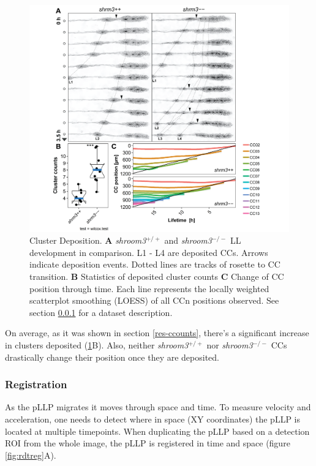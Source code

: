 \documentclass[11pt,singlespacinge,twoside]{reedthesis} %
\theoremstyle{definition}
\theoremstyle{definition}
\theoremstyle{definition}
\theoremstyle{remark}
\begin{document}
\begin{figure}

{\centering \includegraphics[width=0.95\linewidth]{figures/results/03_rosettes/tracking-01} 

}

\caption[Cluster Deposition]{Cluster Deposition. \textbf{A} \emph{shroom3}\(^{+/+}\) and \emph{shroom3}\(^{-/-}\) LL development in comparison. L1 - L4 are deposited CCs. Arrows indicate deposition events. Dotted lines are tracks of rosette to CC transition. \textbf{B} Statistics of deposited cluster counts \textbf{C} Change of CC position through time. Each line represents the locally weighted scatterplot smoothing (LOESS) of all CCn positions observed. See section \ref{res-rosreg} for a dataset description.}\label{fig:rdtdepo}
\end{figure}
On average, as it was shown in section \ref{res-ccounts}, there's a significant increase in clusters deposited (\ref{fig:rdtdepo}B). Also, neither \emph{shroom3}\(^{+/+}\) nor \emph{shroom3}\(^{-/-}\) CCs drastically change their position once they are deposited.

\hypertarget{res-rosreg}{%
\subsubsection{Registration}\label{res-rosreg}}

As the pLLP migrates it moves through space and time. To measure velocity and acceleration, one needs to detect where in space (XY coordinates) the pLLP is located at multiple timepoints. When duplicating the pLLP based on a detection ROI from the whole image, the pLLP is registered in time and space (figure \ref{fig:rdtreg}A).
\end{document}
